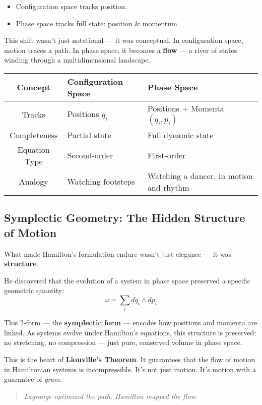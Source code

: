 \begin{itemize}
    \item Configuration space tracks position.
    \item Phase space tracks full state: position \& momentum.
\end{itemize}

This shift wasn’t just notational — it was conceptual. In configuration space, motion traces a path.  
In phase space, it becomes a \textbf{flow} — a river of states winding through a multidimensional landscape.

\begin{center}
\begin{tabularx}{\textwidth}{|c|X|X|}
\hline
\textbf{Concept} & \textbf{Configuration Space} & \textbf{Phase Space} \\
\hline
Tracks & Positions \( q_i \) & Positions + Momenta \( (q_i, p_i) \) \\
\hline
Completeness & Partial state & Full dynamic state \\
\hline
Equation Type & Second-order & First-order \\
\hline
Analogy & Watching footsteps & Watching a dancer, in motion and rhythm \\
\hline
\end{tabularx}
\end{center}

\subsection{Symplectic Geometry: The Hidden Structure of Motion}

What made Hamilton’s formulation endure wasn’t just elegance — it was \textbf{structure}.

He discovered that the evolution of a system in phase space preserved a specific geometric quantity:
\[
\omega = \sum_i dq_i \wedge dp_i
\]

This 2-form — the \textbf{symplectic form} — encodes how positions and momenta are linked.  
As systems evolve under Hamilton’s equations, this structure is preserved:  
no stretching, no compression — just pure, conserved volume in phase space.

This is the heart of \textbf{Liouville’s Theorem}. It guarantees that the flow of motion in Hamiltonian systems is incompressible.  
It’s not just motion. It’s motion with a guarantee of \textit{grace}.

\begin{quote}
    \textit{Lagrange optimized the path.  
    Hamilton mapped the flow.}
\end{quote}
